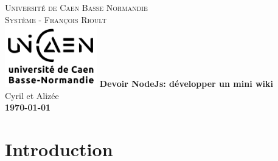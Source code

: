 \documentclass{report}
\begin{document}
\pagestyle{fancy}
\renewcommand\headrulewidth{.2pt}
\renewcommand\footrulewidth{.2pt}
\fancyfoot[L]{\leftmark}
\fancyfoot[C]{}
\fancyfoot[R]{\textbf{\thepage/\pageref{LastPage}}}

\begin{titlepage}
\centering
  {\large \textsc{Université de Caen Basse Normandie}}\\
  \textsc{Système - François Rioult}\\
\vspace{1cm}
  \includegraphics[width=0.30\textwidth]{images/unicaen.png}
\vfill
   {\LARGE \textbf{Devoir NodeJs: développer un mini wiki}} \\
\vspace{2em}
	{\large Cyril  et Alizée } \\
\vspace{1cm}
  {\large\textbf{\today}}\\
\vfill
\end{titlepage}

\renewcommand{\contentsname}{Sommaire}
\tableofcontents
\thispagestyle{fancy}


%
\chapter{Introduction}
\thispagestyle{fancy}
\end{document}

